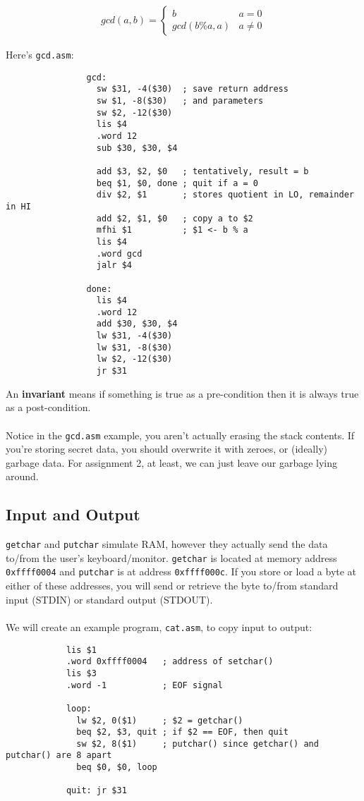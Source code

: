 \documentclass[]{article}
\theoremstyle{definition}
\begin{document}
			\begin{align*}
				gcd(a, b) = \begin{cases}
					b & a = 0 \\
					gcd(b \% a, a) & a \ne 0
				\end{cases}
			\end{align*}
			
			Here's \verb+gcd.asm+:

			\begin{verbatim}
				gcd:
				  sw $31, -4($30)  ; save return address
				  sw $1, -8($30)   ; and parameters
				  sw $2, -12($30)
				  lis $4
				  .word 12
				  sub $30, $30, $4

				  add $3, $2, $0   ; tentatively, result = b
				  beq $1, $0, done ; quit if a = 0
				  div $2, $1       ; stores quotient in LO, remainder in HI
				  add $2, $1, $0   ; copy a to $2
				  mfhi $1          ; $1 <- b % a
				  lis $4
				  .word gcd
				  jalr $4

				done:
				  lis $4
				  .word 12
				  add $30, $30, $4
				  lw $31, -4($30)
				  lw $31, -8($30)
				  lw $2, -12($30)
				  jr $31
			\end{verbatim}

			An \textbf{invariant} means if something is true as a pre-condition then it is always true as a post-condition.
			\\ \\
			Notice in the \verb+gcd.asm+ example, you aren't actually erasing the stack contents. If you're storing secret data, you should overwrite it with zeroes, or (ideally) garbage data. For assignment 2, at least, we can just leave our garbage lying around.
		\subsection{Input and Output}
			\verb+getchar+ and \verb+putchar+ simulate RAM, however they actually send the data to/from the user's keyboard/monitor. \verb+getchar+ is located at memory address \verb+0xffff0004+ and \verb+putchar+ is at address \verb+0xffff000c+. If you store or load a byte at either of these addresses, you will send or retrieve the byte to/from standard input (STDIN) or standard output (STDOUT). 
			\\ \\
			We will create an example program, \verb+cat.asm+, to copy input to output:

			\begin{verbatim}
			lis $1
			.word 0xffff0004   ; address of setchar()
			lis $3
			.word -1           ; EOF signal

			loop:
			  lw $2, 0($1)     ; $2 = getchar()
			  beq $2, $3, quit ; if $2 == EOF, then quit
			  sw $2, 8($1)     ; putchar() since getchar() and putchar() are 8 apart
			  beq $0, $0, loop

			quit: jr $31
			\end{verbatim}
\end{document}
